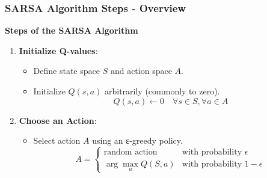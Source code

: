 \documentclass{beamer}
\begin{document}
\begin{frame}[fragile]
    \frametitle{SARSA Algorithm Steps - Overview}
    \textbf{Steps of the SARSA Algorithm}
    \begin{enumerate}
        \item \textbf{Initialize Q-values}:
            \begin{itemize}
                \item Define state space \( S \) and action space \( A \).
                \item Initialize \( Q(s,a) \) arbitrarily (commonly to zero).
                \[
                Q(s,a) \leftarrow 0 \quad \forall s \in S, \forall a \in A
                \]
            \end{itemize}
        \item \textbf{Choose an Action}:
            \begin{itemize}
                \item Select action \( A \) using an ε-greedy policy.
                \[
                A = \begin{cases} 
                \text{random action} & \text{with probability } \epsilon \\ 
                \arg \max_a Q(S, a) & \text{with probability } 1 - \epsilon 
                \end{cases}
                \]
            \end{itemize}
    \end{enumerate}
\end{frame}
\end{document}
